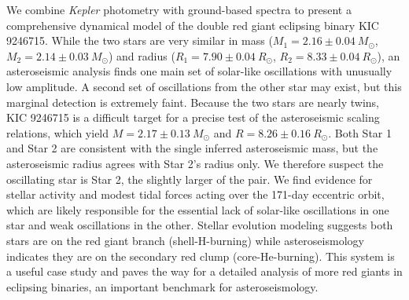 We combine \emph{Kepler} photometry with ground-based spectra to present a comprehensive dynamical model of the double red giant eclipsing binary KIC 9246715. While the two stars are very similar in mass ($M_1 = 2.16\pm0.04 \ M_{\odot}$, $M_2 = 2.14\pm0.03 \ M_{\odot}$) and radius ($R_1 = 7.90\pm0.04 \ R_{\odot}$, $R_2 = 8.33\pm0.04 \ R_{\odot}$), an asteroseismic analysis finds one main set of solar-like oscillations with unusually low amplitude. A second set of oscillations from the other star may exist, but this marginal detection is extremely faint. Because the two stars are nearly twins, KIC 9246715 is a difficult target for a precise test of the asteroseismic scaling relations, which yield $M = 2.17\pm0.13 \ M_{\odot}$ and $R = 8.26\pm0.16 \ R_{\odot}$. Both Star 1 and Star 2 are consistent with the single inferred asteroseismic mass, but the asteroseismic radius agrees with Star 2's radius only. We therefore suspect the oscillating star is Star 2, the slightly larger of the pair. We find evidence for stellar activity and modest tidal forces acting over the 171-day eccentric orbit, which are likely responsible for the essential lack of solar-like oscillations in one star and weak oscillations in the other. Stellar evolution modeling suggests both stars are on the red giant branch (shell-H-burning) while asteroseismology indicates they are on the secondary red clump (core-He-burning). This system is a useful case study and paves the way for a detailed analysis of more red giants in eclipsing binaries, an important benchmark for asteroseismology.
  
  
  
  
  
